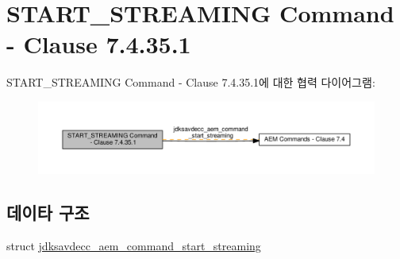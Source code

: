 \hypertarget{group__command__start__streaming}{}\section{S\+T\+A\+R\+T\+\_\+\+S\+T\+R\+E\+A\+M\+I\+NG Command -\/ Clause 7.4.35.1}
\label{group__command__start__streaming}
S\+T\+A\+R\+T\+\_\+\+S\+T\+R\+E\+A\+M\+I\+NG Command -\/ Clause 7.4.35.1에 대한 협력 다이어그램\+:
\nopagebreak
\begin{figure}[H]
\begin{center}
\leavevmode
\includegraphics[width=350pt]{group__command__start__streaming}
\end{center}
\end{figure}
\subsection*{데이타 구조}
\begin{DoxyCompactItemize}
\item 
struct \hyperlink{structjdksavdecc__aem__command__start__streaming}{jdksavdecc\+\_\+aem\+\_\+command\+\_\+start\+\_\+streaming}
\end{DoxyCompactItemize}
